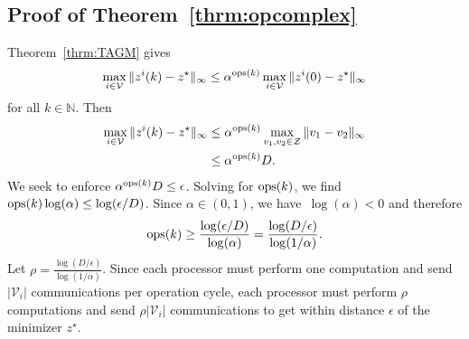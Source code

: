 \documentclass[9pt,shortpaper,twoside,web]{ieeecolor}
\newcommand{\Z}{\ensuremath{\mathcal{Z}}\xspace}
\newcommand{\V}{\ensuremath{\mathcal{V}}\xspace}
\newcommand{\ops}[1]{\textnormal{ops}(#1)}
\begin{document}
    \subsection{Proof of Theorem~\ref{thrm:opcomplex}} \label{app:complex}
    Theorem~\ref{thrm:TAGM} gives
    \begin{equation}
        \max_{i\in\V}\Vert z^i(k)-z^\star\Vert_\infty \leq \alpha^{\ops{k}}\max_{i\in\V}\Vert z^i(0)-z^\star\Vert_\infty
    \end{equation}
    for all $k\in \mathbb N$.
    Then
    \begin{align}
        \max_{i\in\V}\Vert z^i(k)-z^\star\Vert_\infty &\leq \alpha^{\ops{k}}\max_{v_1,v_2\in\Z}\Vert v_1-v_2\Vert_\infty
        \\ &\leq \alpha^{\ops{k}}D.
    \end{align}
    We seek to enforce $\alpha^{\ops{k}}D \leq \epsilon$. 
    Solving for $\ops{k}$, we find
        $\ops{k}\log(\alpha) \leq \log (\epsilon/D)$.
    Since $\alpha \in (0,1)$, we have~$\log(\alpha) < 0$ and therefore
    \begin{align}
        \ops{k}\geq \frac{\log(\epsilon/D)}{\log(\alpha)} = \frac{\log(D/\epsilon)}{\log(1/\alpha)}.
    \end{align}
    Let $\rho = \frac{\log(D/\epsilon)}{\log(1/\alpha)}$.
    Since each processor must perform one computation and send~$\vert \V_i\vert$ communications per operation cycle, each processor must perform $\rho$ computations and send $\rho\vert \V_i\vert$ communications to get within 
    distance $\epsilon$ of the minimizer $z^\star$.





\end{document}
